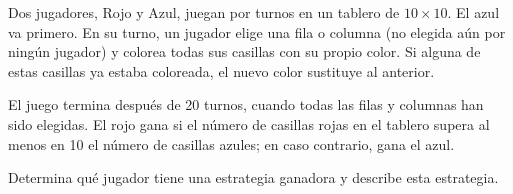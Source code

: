 Dos jugadores, Rojo y Azul, juegan por turnos en un tablero de $10\times 10$. El azul va primero. En su turno, un jugador elige una fila o columna (no elegida aún por ningún jugador) y colorea todas sus casillas con su propio color. Si alguna de estas casillas ya estaba coloreada, el nuevo color sustituye al anterior.

El juego termina después de 20 turnos, cuando todas las filas y columnas han sido elegidas. El rojo gana si el número de casillas rojas en el tablero supera al menos en 10 el número de casillas azules; en caso contrario, gana el azul. 

Determina qué jugador tiene una estrategia ganadora y describe esta estrategia.
